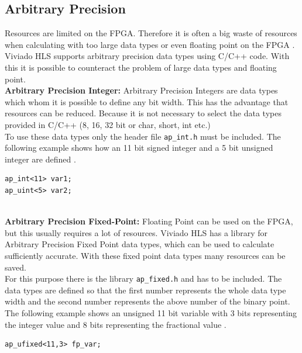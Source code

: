 \subsection{Arbitrary Precision} \label{ch:ap}
Resources are limited on the FPGA. Therefore it is often a big waste of resources when calculating with too large data types or even floating point on the FPGA \cite{floating}. Viviado HLS supports arbitrary precision data types using C/C++ code. With this it is possible to counteract the problem of large data types and floating point. \\

\textbf{Arbitrary Precision Integer:}
Arbitrary Precision Integers are data types which whom it is possible to define
any bit width. This has the advantage that resources can be reduced. Because it is not necessary to select the data types provided in C/C++ (8, 16, 32 bit or char, short, int etc.) \\
To use these data types only the header file \texttt{ap\_int.h} must be
included. The following example shows how an 11 bit signed integer and a 5 bit unsigned integer are defined \cite{ug902}.

\begin{minipage}{\textwidth}
\begin{lstlisting}[style=CStyle]
ap_int<11> var1;
ap_uint<5> var2;
\end{lstlisting}
\end{minipage} \\

\textbf{Arbitrary Precision Fixed-Point:}
Floating Point can be used on the FPGA, but this usually requires a lot of resources. Viviado HLS has a library for Arbitrary Precision Fixed Point data types, which can be used to calculate sufficiently accurate. With these fixed point data types many resources can be saved. \\
For this purpose there is the library \texttt{ap\_fixed.h} and has to be
included. The data types are defined so that the first number represents the whole data type width and the second number represents the above number of the binary point. The following example shows an unsigned 11 bit variable with 3 bits representing the integer value and 8 bits representing the fractional value \cite{ug902}.

\begin{minipage}{\textwidth}
\begin{lstlisting}[style=CStyle]
ap_ufixed<11,3> fp_var;
\end{lstlisting}
\end{minipage}

